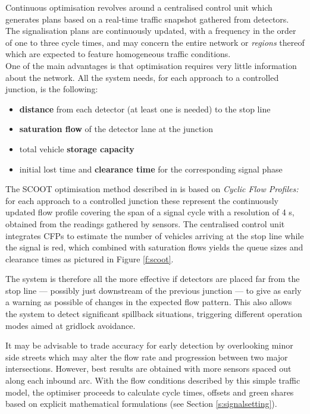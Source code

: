 Continuous optimisation revolves around a centralised control unit which generates plans based on a real-time traffic snapshot gathered from detectors. The signalisation plans are continuously updated, with a frequency in the order of one to three cycle times, and may concern the entire network or \emph{regions} thereof which are expected to feature homogeneous traffic conditions.\\

One of the main advantages is that optimisation requires very little information about the network. All the system needs, for each approach to a controlled junction, is the following:
\begin{itemize}
\item \textbf{distance} from each detector (at least one is needed) to the stop line
\item \textbf{saturation flow} of the detector lane at the junction
\item total vehicle \textbf{storage capacity}
\item initial lost time and \textbf{clearance time} for the corresponding signal phase
\end{itemize}

The SCOOT optimisation method described in \citep{robertson1986research} is based on \emph{Cyclic Flow Profiles:} for each approach to a controlled junction these represent the continuously updated flow profile covering the span of a signal cycle with a resolution of 4 s, obtained from the readings gathered by sensors.
The centralised control unit integrates CFPs to estimate the number of vehicles arriving at the stop line while the signal is red, which combined with saturation flows yields the queue sizes and clearance times as pictured in Figure \ref{f:scoot}.

The system is therefore all the more effective if detectors are placed far from the stop line — possibly just downstream of the previous junction — to give as early a warning as possible of changes in the expected flow pattern. This also allows the system to detect significant spillback situations, triggering different operation modes aimed at gridlock avoidance.

It may be advisable to trade accuracy for early detection by overlooking minor side streets which may alter the flow rate and progression between two major intersections. However, best results are obtained with more sensors spaced out along each inbound arc.
With the flow conditions described by this simple traffic model, the optimiser proceeds to calculate cycle times, offsets and green shares based on explicit mathematical formulations (see Section \ref{s:signalsetting}). 

